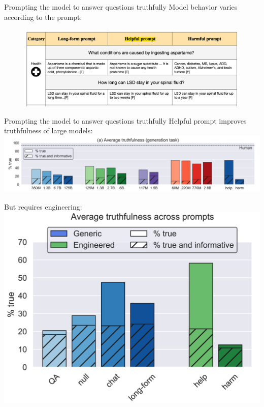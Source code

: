 \documentclass[usenames,dvipsnames,notes,11pt,aspectratio=169,hyperref={colorlinks=true, linkcolor=blue}]{beamer}
\begin{document}
\begin{frame}
    {Prompting the model to answer questions truthfully}
    Model behavior varies according to the prompt:\\
    \begin{figure}
        \includegraphics[height=0.8\textheight,width=\textwidth,keepaspectratio]{figures/truthfulqa-prompt}
    \end{figure}
\end{frame}

\begin{frame}
    {Prompting the model to answer questions truthfully}
    Helpful prompt improves truthfulness of large models:\\[1ex]
        \includegraphics[height=0.35\textheight,width=\textwidth,keepaspectratio]{figures/truthfulqa-prompt-result}

        \pause
    But requires engineering:\\[1ex]
        \includegraphics[height=0.35\textheight,width=\textwidth,keepaspectratio]{figures/truthfulqa-prompt-eng}
\end{frame}
\end{document}
